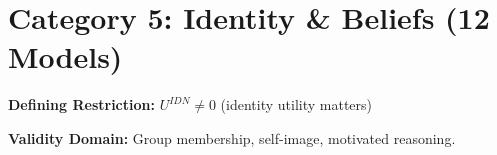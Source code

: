 \section{Category 5: Identity \& Beliefs (12 Models)}
\label{sec:ms-identity}

\begin{tcolorbox}[colback=gray!5!white, colframe=gray!75!black,
    title=\textbf{Identity \& Beliefs: The $U^{IDN}$ Extension}]

\textbf{Defining Restriction:} $U^{IDN} \neq 0$ (identity utility matters)

\textbf{Validity Domain:} Group membership, self-image, motivated reasoning.

\end{tcolorbox}

